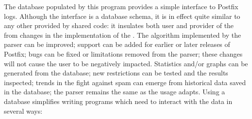 \documentclass[a4paper,12pt,draft]{article}
\begin{document}
The database populated by this program provides a simple interface to
Postfix logs.  Although the interface is a database schema, it is in effect
quite similar to any other \API{} provided by shared code: it insulates
both user and provider of the \API{} from changes in the implementation of
the \API{}\@.  The algorithm implemented by the parser can be improved;
support can be added for earlier or later releases of Postfix; bugs can be
fixed or limitations removed from the parser; these changes will not cause
the user to be negatively impacted.  Statistics and/or graphs can be
generated from the database; new restrictions can be tested and the results
inspected; trends in the fight against spam can emerge from historical data
saved in the database; the parser remains the same as the usage adapts.
Using a database simplifies writing programs which need to interact with
the data in several ways:
\end{document}
